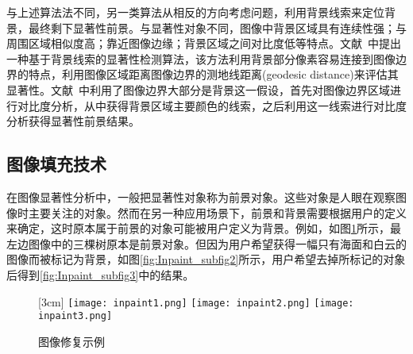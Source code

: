 与上述算法法不同，另一类算法从相反的方向考虑问题，利用背景线索来定位背景，最终剩下显著性前景。与显著性对象不同，图像中背景区域具有连续性强；与周围区域相似度高；靠近图像边缘；背景区域之间对比度低等特点。文献~\cite{geodesicDistance}中提出一种基于背景线索的显著性检测算法，该方法利用背景部分像素容易连接到图像边界的特点，利用图像区域距离图像边界的测地线距离(geodesic distance)来评估其显著性。文献~中利用了图像边界大部分是背景这一假设，首先对图像边界区域进行对比度分析，从中获得背景区域主要颜色的线索，之后利用这一线索进行对比度分析获得显著性前景结果。

\subsection{图像填充技术}
\label{sec:imageInpainting}
在图像显著性分析中，一般把显著性对象称为前景对象。这些对象是人眼在观察图像时主要关注的对象。然而在另一种应用场景下，前景和背景需要根据用户的定义来确定，这时原本属于前景的对象可能被用户定义为背景。例如，如图\ref{fig:inpainting}所示，最左边图像中的三棵树原本是前景对象。但因为用户希望获得一幅只有海面和白云的图像而被标记为背景，如图\ref{fig:Inpaint_subfig2}所示，用户希望去掉所标记的对象后得到\ref{fig:Inpaint_subfig3}中的结果。

\begin{figure}[h]
  \centering%
  [3cm] %
    {\texttt{[image: inpaint1.png]}}%
  \hspace{4em}%
     {\texttt{[image: inpaint2.png]}}
  \hspace{1em}%
    {\texttt{[image: inpaint3.png]}}
  \caption{图像修复示例~\cite{Criminisi04regionfilling}}
  \label{fig:inpainting}
\end{figure}

